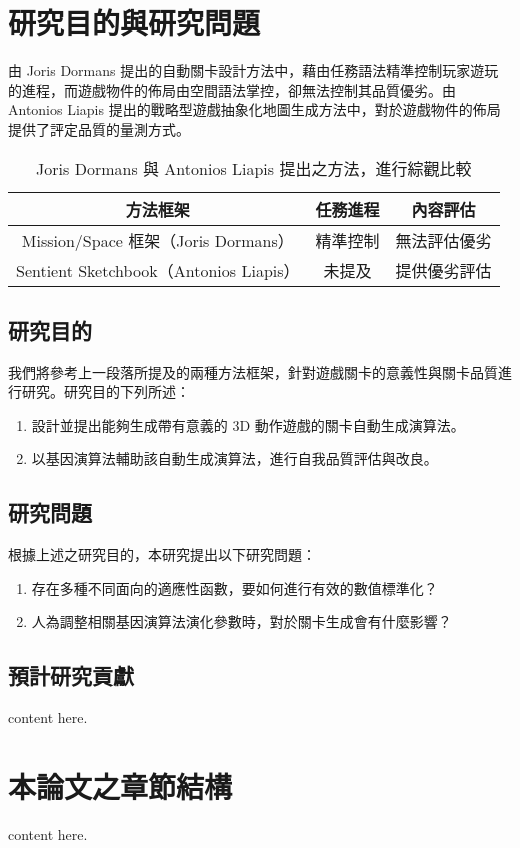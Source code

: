 \section{研究目的與研究問題}

由 Joris Dormans 提出的自動關卡設計方法中，藉由任務語法精準控制玩家遊玩的進程，而遊戲物件的佈局由空間語法掌控，卻無法控制其品質優劣。由 Antonios Liapis 提出的戰略型遊戲抽象化地圖生成方法中，對於遊戲物件的佈局提供了評定品質的量測方式。

\begin{table}[!htb]
  \centering
  \caption{Joris Dormans 與 Antonios Liapis 提出之方法，進行綜觀比較}
  \label{tbl:compare-the-method-form-jd-and-al}
  \bigskip
  \begin{tabular}{ | c | c | c | }
    \hline
    方法框架                               & 任務進程 & 內容評估     \\\hline
    Mission/Space 框架（Joris Dormans）    & 精準控制 & 無法評估優劣 \\\hline
    Sentient Sketchbook（Antonios Liapis） & 未提及   & 提供優劣評估 \\\hline
  \end{tabular}
\end{table}

\subsection{研究目的}

我們將參考上一段落所提及的兩種方法框架，針對遊戲關卡的意義性與關卡品質進行研究。研究目的下列所述：

\begin{enumerate}
  \item 設計並提出能夠生成帶有意義的 3D 動作遊戲的關卡自動生成演算法。
  \item 以基因演算法輔助該自動生成演算法，進行自我品質評估與改良。
\end{enumerate}

\subsection{研究問題}

根據上述之研究目的，本研究提出以下研究問題：

\begin{enumerate}
  \item 存在多種不同面向的適應性函數，要如何進行有效的數值標準化？
  \item 人為調整相關基因演算法演化參數時，對於關卡生成會有什麼影響？
\end{enumerate}

\subsection{預計研究貢獻}

content here.

\section{本論文之章節結構}

content here.

